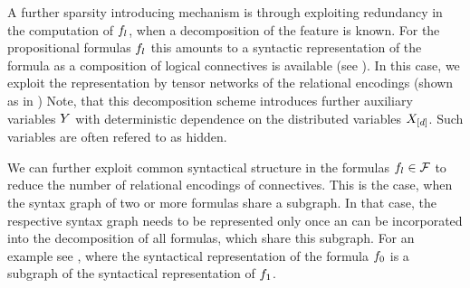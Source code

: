 A further sparsity introducing mechanism is through exploiting redundancy in the computation of $f_{l}$, when a decomposition of the feature is known.
For the propositional formulas $f_{l}$ this amounts to a syntactic representation of the formula as a composition of logical connectives is available (see ). %
In this case, we exploit the representation by tensor networks of the relational encodings (shown as  in )
Note, that this decomposition scheme introduces further auxiliary variables $Y$ with deterministic dependence on the distributed variables $X_{[d]}$.
Such variables are often refered to as hidden.

We can further exploit common syntactical structure in the formulas $f_{l}\in\mathcal{F}$ to reduce the number of relational encodings of connectives.
This is the case, when the syntax graph of two or more formulas share a subgraph.
In that case, the respective syntax graph needs to be represented only once an can be incorporated into the decomposition of all formulas, which share this subgraph.
For an example see , where the syntactical representation of the formula $f_{0}$ is a subgraph of the syntactical representation of $f_{1}$.





